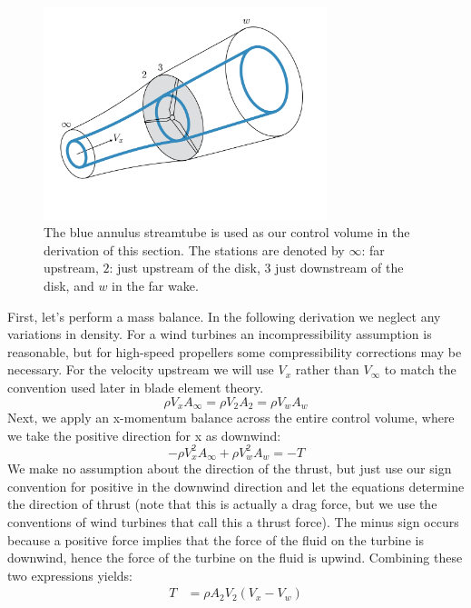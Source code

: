 \documentclass{article}
\begin{document}
\begin{figure}[htbp]
\centering
\includegraphics[width=3.25in]{figures/annulus}
\caption{The blue annulus streamtube is used as our control volume in the derivation of this section.  The stations are denoted by $\infty$: far upstream, $2$: just upstream of the disk, $3$ just downstream of the disk, and $w$ in the far wake.}
\label{fig:annulus}
\end{figure}

First, let's perform a mass balance.  In the following derivation we neglect any variations in density.  For a wind turbines an incompressibility assumption is reasonable, but for high-speed propellers some compressibility corrections may be necessary.  For the velocity upstream we will use $V_x$ rather than $V_\infty$ to match the convention used later in blade element theory.
\begin{equation}
    \rho V_x A_\infty = \rho V_2 A_2 = \rho V_w A_w
\end{equation}
Next, we apply an x-momentum balance across the entire control volume, where we take the positive direction for x as downwind:
\begin{equation}
    -\rho V_x^2 A_\infty + \rho V_w^2 A_w = - T
\end{equation}
We make no assumption about the direction of the thrust, but just use our sign convention for positive in the downwind direction and let the equations determine the direction of thrust (note that this is actually a drag force, but we use the conventions of wind turbines that call this a thrust force).  The minus sign occurs because a positive force implies that the force of the fluid on the turbine is downwind, hence the force of the turbine on the fluid is upwind.  Combining these two expressions yields:
\begin{equation}
\begin{aligned}
    T &= \rho A_2 V_2 (V_x - V_w)\\
\end{aligned}
\label{eq:thrust1}
\end{equation}
\end{document}
